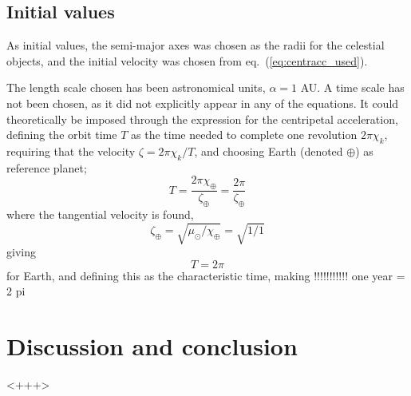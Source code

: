 \documentclass[a4paper,11pt]{article}
\begin{document}
\subsection{Initial values}
As initial values, the semi-major axes was chosen as the radii for the celestial objects, and the initial velocity was chosen from eq.~(\ref{eq:centracc_used}).

The length scale chosen has been astronomical units, $\alpha = 1$ AU. A time scale has not been chosen, as it did not explicitly appear in any of the equations. It could theoretically be imposed through the expression for the centripetal acceleration, defining the orbit time $T$ as the time needed to complete one revolution $2 \pi \chi_k$, requiring that the velocity $\zeta = 2\pi \chi_k / T$, and choosing Earth (denoted $\oplus$) as reference planet;
\[ T = \frac{2\pi \chi_\oplus}{\zeta_\oplus} = \frac{2 \pi}{\zeta_\oplus} \]
where the tangential velocity is found,
\[ \zeta_\oplus = \sqrt{\mu_\odot/\chi_\oplus} = \sqrt{1/1} \]
giving
\[ T = 2\pi \]
for Earth, and defining this as the characteristic time, making 
!!!!!!!!!!!
one year = 2 pi




\section{Discussion and conclusion}<+++>



\end{document}
